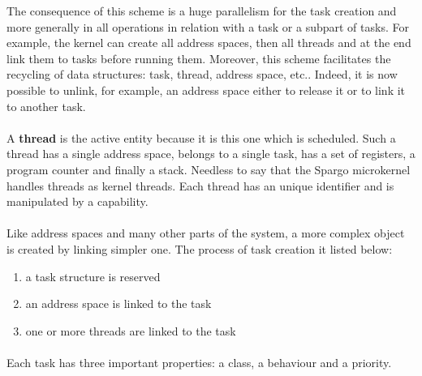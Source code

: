 \documentclass[10pt,a4wide]{article}
\begin{document}
\begin{multicols}{2}
The consequence of this scheme is a huge parallelism for the
task creation and more generally in all operations in relation with
a task or a subpart of tasks. For example, the kernel can create all
address spaces, then all threads and at the end link them to tasks before
running them. Moreover, this scheme facilitates the recycling of data
structures: task, thread, address space, etc.. Indeed, it is now possible to
unlink, for example, an address space either to release it or to link it to
another task.

\paragraph{}

A \textbf{thread} is the active entity because it is this one which is
scheduled. Such a thread has a single address space, belongs to a single
task, has a set of registers, a program counter and finally a stack.
Needless to say that the Spargo microkernel handles threads as kernel threads.
Each thread has an unique identifier and is manipulated by a capability.

\paragraph{}

Like address spaces and many other parts of the system, a more complex
object is created by linking simpler one. The process of task creation
it listed below:

\begin{enumerate}

\item a task structure is reserved

\item an address space is linked to the task

\item one or more threads are linked to the task

\end{enumerate}

\paragraph{}

Each task has three important properties: a class, a behaviour and a priority.

\paragraph{}


\end{multicols}
\end{document}
